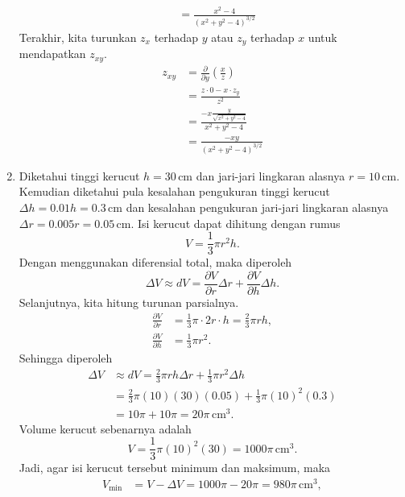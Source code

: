 \documentclass[11pt,a4paper]{article}
\begin{document}
\begin{enumerate}
\begin{align*}
                 & = \frac{x^2 - 4}{(x^2 + y^2 - 4)^{3/2}}
        \end{align*}
        Terakhir, kita turunkan $z_x$ terhadap $y$ atau $z_y$ terhadap $x$ untuk mendapatkan $z_{xy}$.
        \begin{align*}
          z_{xy} & = \frac{\partial}{\partial y}\left(\frac{x}{z}\right)      \\
                 & = \frac{z \cdot 0 - x \cdot z_y}{z^2}                      \\
                 & = \frac{- x \frac{y}{\sqrt{x^2 + y^2 - 4}}}{x^2 + y^2 - 4} \\
                 & = \frac{-xy}{(x^2 + y^2 - 4)^{3/2}}
        \end{align*}

  \item Diketahui tinggi kerucut $h = 30\,\text{cm}$ dan jari-jari lingkaran alasnya $r = 10\,\text{cm}$. Kemudian diketahui pula kesalahan pengukuran tinggi kerucut $\Delta h = 0.01h = 0.3\,\text{cm}$ dan kesalahan pengukuran jari-jari lingkaran alasnya $\Delta r = 0.005r = 0.05\,\text{cm}$.
        Isi kerucut dapat dihitung dengan rumus
        \[
          V = \frac{1}{3} \pi r^2 h.
        \]
        Dengan menggunakan diferensial total, maka diperoleh
        \[
          \Delta V \approx dV = \frac{\partial V}{\partial r} \Delta r + \frac{\partial V}{\partial h} \Delta h.
        \]
        Selanjutnya, kita hitung turunan parsialnya.
        \begin{align*}
          \frac{\partial V}{\partial r} & = \frac{1}{3} \pi \cdot 2r \cdot h = \frac{2}{3} \pi r h, \\
          \frac{\partial V}{\partial h} & = \frac{1}{3} \pi r^2.
        \end{align*}
        Sehingga diperoleh
        \begin{align*}
          \Delta V & \approx dV = \frac{2}{3} \pi r h \Delta r + \frac{1}{3} \pi r^2 \Delta h \\
                   & = \frac{2}{3} \pi (10)(30)(0.05) + \frac{1}{3} \pi (10)^2(0.3)           \\
                   & = 10\pi + 10\pi = 20\pi\,\text{cm}^3.
        \end{align*}
        Volume kerucut sebenarnya adalah
        \[
          V = \frac{1}{3} \pi (10)^2 (30) = 1000\pi\,\text{cm}^3.
        \]
        Jadi, agar isi kerucut tersebut minimum dan maksimum, maka
        \begin{align*}
          V_{\min} & = V - \Delta V = 1000\pi - 20\pi = 980\pi\,\text{cm}^3,  \\

\end{align*}
\end{enumerate}
\end{document}
